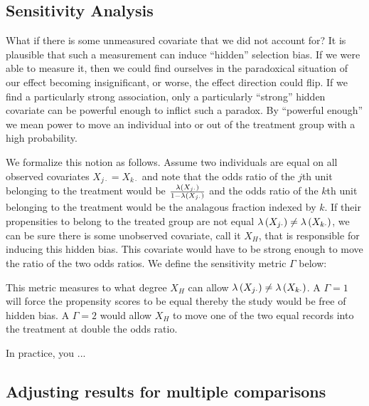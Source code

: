 \documentclass[12pt]{article}
\begin{document}
\subsection{Sensitivity Analysis}

What if there is some unmeasured covariate that we did not account for? It is plausible that such a measurement can induce ``hidden'' selection bias. If we were able to measure it, then we could find ourselves in the paradoxical situation of our effect becoming insignificant, or worse, the effect direction could flip. If we find a particularly strong association, only a particularly ``strong'' hidden covariate can be powerful enough to inflict such a paradox. By ``powerful enough'' we mean power to move an individual into or out of the treatment group with a high probability. 

We formalize this notion as follows. Assume two individuals are equal on all observed covariates \ie $X_{j \cdot} = X_{k \cdot}$ and note that the odds ratio of the $j$th unit belonging to the treatment would be $\frac{\lambda\left(X_{j \cdot}\right)}{1 - \lambda\left(X_{j \cdot}\right)}$ and the odds ratio of the $k$th unit belonging to the treatment would be the analagous fraction indexed by $k$. If their propensities to belong to the treated group are not equal \ie $\lambda\left(X_{j \cdot}\right) \neq \lambda\left(X_{k \cdot}\right)$, we can be sure there is some unobserved covariate, call it $X_H$, that is responsible for inducing this hidden bias. This covariate would have to be strong enough to move the ratio of the two odds ratios. We define the sensitivity metric $\Gamma$ below:

\beqn
{} \leq \Gamma \mathand {} \leq \Gamma
\eeqn

This metric measures to what degree $X_H$ can allow $\lambda\left(X_{j \cdot}\right) \neq \lambda\left(X_{k \cdot}\right)$. A $\Gamma = 1$ will force the propensity scores to be equal thereby the study would be free of hidden bias. A $\Gamma = 2$ would allow $X_H$ to move one of the two equal records into the treatment at double the odds ratio.

In practice, you ...


\subsection{Adjusting results for multiple comparisons}
\end{document}
